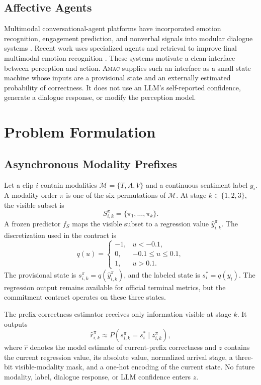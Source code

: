\documentclass[journal]{IEEEtran}
\newcommand{\method}{\textsc{Amac}}
\begin{document}
\subsection{Affective Agents}

Multimodal conversational-agent platforms have incorporated emotion recognition, engagement prediction, and nonverbal signals into modular dialogue systems \cite{li2020adviser}. Recent work uses specialized agents and retrieval to improve final multimodal emotion recognition \cite{wang2026affectagent}. These systems motivate a clean interface between perception and action. \method{} supplies such an interface as a small state machine whose inputs are a provisional state and an externally estimated probability of correctness. It does not use an LLM's self-reported confidence, generate a dialogue response, or modify the perception model.

\section{Problem Formulation}

\subsection{Asynchronous Modality Prefixes}

Let a clip $i$ contain modalities $\mathcal{M}=\{T,A,V\}$ and a continuous sentiment label $y_i$. A modality order $\pi$ is one of the six permutations of $\mathcal{M}$. At stage $k \in \{1,2,3\}$, the visible subset is
\begin{equation}
S_{i,k}^{\pi}=\{\pi_1,\ldots,\pi_k\}.
\end{equation}
A frozen predictor $f_{S}$ maps the visible subset to a regression value $\hat{y}_{i,k}^{\pi}$. The discretization used in the contract is
\begin{equation}
q(u)=
\begin{cases}
-1, & u < -0.1,\\
0, & -0.1 \leq u \leq 0.1,\\
1, & u > 0.1.
\end{cases}
\end{equation}
The provisional state is $s_{i,k}^{\pi}=q(\hat{y}_{i,k}^{\pi})$, and the labeled state is $s_i^*=q(y_i)$. The regression output remains available for official terminal metrics, but the commitment contract operates on these three states.

The prefix-correctness estimator receives only information visible at stage $k$. It outputs
\begin{equation}
\hat r_{i,k}^{\pi}\approx P(s_{i,k}^{\pi}=s_i^*\mid z_{i,k}^{\pi}),
\end{equation}
where $\hat r$ denotes the model estimate of current-prefix correctness and $z$ contains the current regression value, its absolute value, normalized arrival stage, a three-bit visible-modality mask, and a one-hot encoding of the current state. No future modality, label, dialogue response, or LLM confidence enters $z$.
\end{document}
